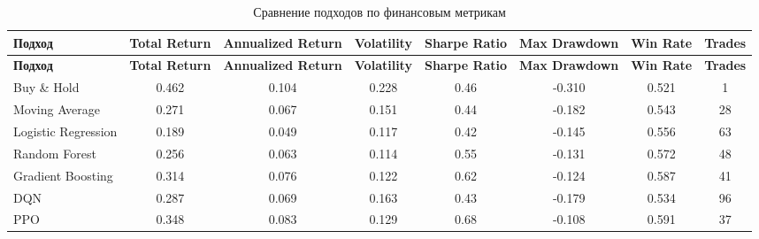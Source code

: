 \begin{center}
\scriptsize
\begin{longtable}{|p{3.2cm}|c|c|c|c|c|c|c|}
\caption{Сравнение подходов по финансовым метрикам}\label{tab:financial_results}\\
\hline
\textbf{Подход} & \textbf{Total Return} & \textbf{Annualized Return} & \textbf{Volatility} & \textbf{Sharpe Ratio} & \textbf{Max Drawdown} & \textbf{Win Rate} & \textbf{Trades} \\
\hline
\endfirsthead
\hline
\textbf{Подход} & \textbf{Total Return} & \textbf{Annualized Return} & \textbf{Volatility} & \textbf{Sharpe Ratio} & \textbf{Max Drawdown} & \textbf{Win Rate} & \textbf{Trades} \\
\hline
\endhead
Buy \& Hold & 0.462 & 0.104 & 0.228 & 0.46 & -0.310 & 0.521 & 1 \\
\hline
Moving Average & 0.271 & 0.067 & 0.151 & 0.44 & -0.182 & 0.543 & 28 \\
\hline
Logistic Regression & 0.189 & 0.049 & 0.117 & 0.42 & -0.145 & 0.556 & 63 \\
\hline
Random Forest & 0.256 & 0.063 & 0.114 & 0.55 & -0.131 & 0.572 & 48 \\
\hline
Gradient Boosting & 0.314 & 0.076 & 0.122 & 0.62 & -0.124 & 0.587 & 41 \\
\hline
DQN & 0.287 & 0.069 & 0.163 & 0.43 & -0.179 & 0.534 & 96 \\
\hline
PPO & 0.348 & 0.083 & 0.129 & 0.68 & -0.108 & 0.591 & 37 \\
\hline
\end{longtable}
\end{center}
